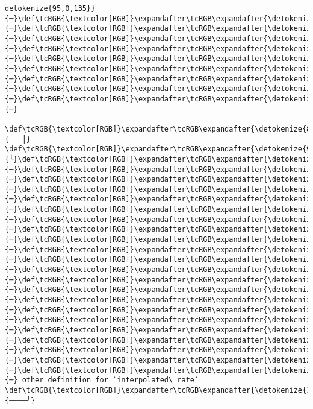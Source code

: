 \documentclass[11pt]{article}
\begin{document}
\begin{Verbatim}[commandchars=\\\{\}, frame=single, framerule=2mm, rulecolor=\color{outerrorbackground}]
detokenize{95,0,135}}{─}\def\tcRGB{\textcolor[RGB]}\expandafter\tcRGB\expandafter{\detokenize{95,0,135}}{─}\def\tcRGB{\textcolor[RGB]}\expandafter\tcRGB\expandafter{\detokenize{95,0,135}}{─}\def\tcRGB{\textcolor[RGB]}\expandafter\tcRGB\expandafter{\detokenize{95,0,135}}{─}\def\tcRGB{\textcolor[RGB]}\expandafter\tcRGB\expandafter{\detokenize{95,0,135}}{─}\def\tcRGB{\textcolor[RGB]}\expandafter\tcRGB\expandafter{\detokenize{95,0,135}}{─}\def\tcRGB{\textcolor[RGB]}\expandafter\tcRGB\expandafter{\detokenize{95,0,135}}{─}\def\tcRGB{\textcolor[RGB]}\expandafter\tcRGB\expandafter{\detokenize{95,0,135}}{─}\def\tcRGB{\textcolor[RGB]}\expandafter\tcRGB\expandafter{\detokenize{95,0,135}}{─}\def\tcRGB{\textcolor[RGB]}\expandafter\tcRGB\expandafter{\detokenize{95,0,135}}{─}  
 \def\tcRGB{\textcolor[RGB]}\expandafter\tcRGB\expandafter{\detokenize{88,88,88}}{   │}                          \def\tcRGB{\textcolor[RGB]}\expandafter\tcRGB\expandafter{\detokenize{95,0,135}}{╰}\def\tcRGB{\textcolor[RGB]}\expandafter\tcRGB\expandafter{\detokenize{95,0,135}}{─}\def\tcRGB{\textcolor[RGB]}\expandafter\tcRGB\expandafter{\detokenize{95,0,135}}{─}\def\tcRGB{\textcolor[RGB]}\expandafter\tcRGB\expandafter{\detokenize{95,0,135}}{─}\def\tcRGB{\textcolor[RGB]}\expandafter\tcRGB\expandafter{\detokenize{95,0,135}}{─}\def\tcRGB{\textcolor[RGB]}\expandafter\tcRGB\expandafter{\detokenize{95,0,135}}{─}\def\tcRGB{\textcolor[RGB]}\expandafter\tcRGB\expandafter{\detokenize{95,0,135}}{─}\def\tcRGB{\textcolor[RGB]}\expandafter\tcRGB\expandafter{\detokenize{95,0,135}}{─}\def\tcRGB{\textcolor[RGB]}\expandafter\tcRGB\expandafter{\detokenize{95,0,135}}{─}\def\tcRGB{\textcolor[RGB]}\expandafter\tcRGB\expandafter{\detokenize{95,0,135}}{─}\def\tcRGB{\textcolor[RGB]}\expandafter\tcRGB\expandafter{\detokenize{95,0,135}}{─}\def\tcRGB{\textcolor[RGB]}\expandafter\tcRGB\expandafter{\detokenize{95,0,135}}{─}\def\tcRGB{\textcolor[RGB]}\expandafter\tcRGB\expandafter{\detokenize{95,0,135}}{─}\def\tcRGB{\textcolor[RGB]}\expandafter\tcRGB\expandafter{\detokenize{95,0,135}}{─}\def\tcRGB{\textcolor[RGB]}\expandafter\tcRGB\expandafter{\detokenize{95,0,135}}{─}\def\tcRGB{\textcolor[RGB]}\expandafter\tcRGB\expandafter{\detokenize{95,0,135}}{─}\def\tcRGB{\textcolor[RGB]}\expandafter\tcRGB\expandafter{\detokenize{95,0,135}}{─}\def\tcRGB{\textcolor[RGB]}\expandafter\tcRGB\expandafter{\detokenize{95,0,135}}{─}\def\tcRGB{\textcolor[RGB]}\expandafter\tcRGB\expandafter{\detokenize{95,0,135}}{─}\def\tcRGB{\textcolor[RGB]}\expandafter\tcRGB\expandafter{\detokenize{95,0,135}}{─}\def\tcRGB{\textcolor[RGB]}\expandafter\tcRGB\expandafter{\detokenize{95,0,135}}{─}\def\tcRGB{\textcolor[RGB]}\expandafter\tcRGB\expandafter{\detokenize{95,0,135}}{─}\def\tcRGB{\textcolor[RGB]}\expandafter\tcRGB\expandafter{\detokenize{95,0,135}}{─} other definition for `interpolated\_rate`
\def\tcRGB{\textcolor[RGB]}\expandafter\tcRGB\expandafter{\detokenize{148,148,148}}{────╯}
    \end{Verbatim}
\end{document}
